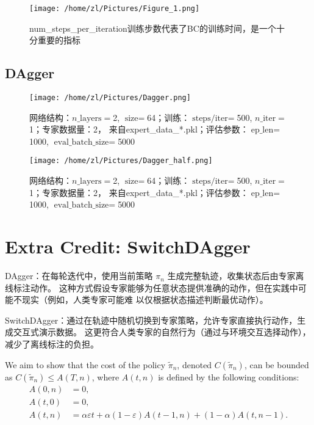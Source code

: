 \documentclass[12pt,oneside]{book}
\begin{document}
\begin{figure}[h!]
    \centering
    \texttt{[image: /home/zl/Pictures/Figure\_1.png]}
    \caption{num\_steps\_per\_iteration训练步数代表了BC的训练时间，是一个十分重要的指标}
    \label{fig:figure1}
\end{figure}
    
\subsection{DAgger}

\begin{figure}[h!]
    \centering
    \texttt{[image: /home/zl/Pictures/Dagger.png]}
    \caption{网络结构：\(n\_\text{layers}=\)2, 
    \(\text{size}=\)64；训练：\(\text{steps/iter}=\)500, 
    \(n\_\text{iter}=\)1；专家数据量：2，
    来自expert\_data\_*.pkl；评估参数：\(\text{ep\_len}=\)1000, 
    \(\text{eval\_batch\_size}=\)5000}
    \label{fig:figure2}
\end{figure}

\begin{figure}[h!]
    \centering
    \texttt{[image: /home/zl/Pictures/Dagger\_half.png]}
    \caption{网络结构：\(n\_\text{layers}=\)2, 
    \(\text{size}=\)64；训练：\(\text{steps/iter}=\)500, 
    \(n\_\text{iter}=\)1；专家数据量：2，
    来自expert\_data\_*.pkl；评估参数：\(\text{ep\_len}=\)1000, 
    \(\text{eval\_batch\_size}=\)5000}
    \label{fig:figure3}
\end{figure}

\section{Extra Credit: SwitchDAgger}

DAgger：在每轮迭代中，使用当前策略 $\pi_n$ 生成完整轨迹，收集状态后由专家离线标注动作。
这种方式假设专家能够为任意状态提供准确的动作，但在实践中可能不现实（例如，人类专家可能难
以仅根据状态描述判断最优动作）。

SwitchDAgger：通过在轨迹中随机切换到专家策略，允许专家直接执行动作，生成交互式演示数据。
这更符合人类专家的自然行为（通过与环境交互选择动作），减少了离线标注的负担。

We aim to show that the cost of the policy \(\tilde{\pi}_n\), 
denoted \(C(\tilde{\pi}_n)\), can be bounded as \(C(\tilde{\pi}_n) \leq A(T, n)\), 
where \(A(t, n)\) is defined by the following conditions:
\begin{align*}
A(0, n) &= 0, \\
A(t, 0) &= 0, \\
A(t, n) &= \alpha \varepsilon t + \alpha (1 - \varepsilon) A(t - 1, n) + (1 - \alpha) A(t, n - 1).
\end{align*}
\end{document}
